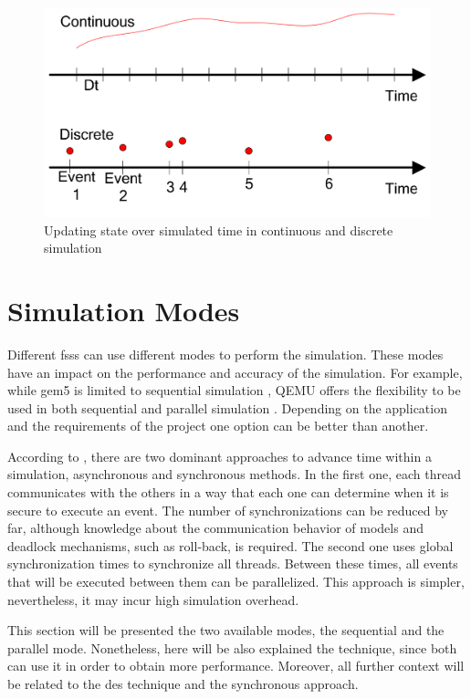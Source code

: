 \begin{figure}[H]
	\centering
 	\includegraphics[width=0.7\linewidth]{Images/DesVsCes.png}
 	\caption{Updating state over simulated time in continuous and discrete simulation \cite{helal2008hybrid}}
	 \label{fig_DesVsCes}
\end{figure}


\section{Simulation Modes}

Different \glspl{fss} can use different modes to perform the simulation. These modes have an impact on the performance and accuracy of the simulation. For example, while gem5 is limited to sequential simulation \cite{TheGem5Simulator}, QEMU offers the flexibility to be used in both sequential and parallel simulation \cite{QEMUDoc}. Depending on the application and the requirements of the project one option can be better than another.

According to \cite{parallelTypes}, there are two dominant approaches to advance time within a simulation, asynchronous and synchronous methods. In the first one, each thread communicates with the others in a way that each one can determine when it is secure to execute an event. The number of synchronizations can be reduced by far, although knowledge about the communication behavior of models and deadlock mechanisms, such as roll-back, is required. The second one uses global synchronization times to synchronize all threads. Between these times, all events that will be executed between them can be parallelized. This approach is simpler, nevertheless, it may incur high simulation overhead.

This section will be presented the two available modes, the sequential and the parallel mode. Nonetheless, here will be also explained the  technique, since both can use it in order to obtain more performance. Moreover, all further context will be related to the \gls{des} technique and the synchronous approach.

